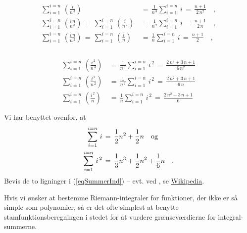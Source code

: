\begin{exercise}
\begin{equation}\label{eqSummings2}
\begin{aligned}
\sum_{i=1}^{i=n}\, \left(\frac{i}{n^{\,3}}\right)\, &= \, \frac{1}{n^{\,3}}\sum_{i=1}^{i=n}\,i \, = \,   \frac{n+1}{2\,n^{2}}\quad , \\
\sum_{i=1}^{i=n}\, \left(\frac{i\,n}{n^{\,3}}\right) \,=\, \sum_{i=1}^{i=n}\, \left(\frac{i}{n^{\,2}}\right)\, &= \, \frac{1}{n^{\,2}}\sum_{i=1}^{i=n}\,i  \, = \,  \frac{n+1}{2\,n} \quad ,\\
\sum_{i=1}^{i=n}\, \left(\frac{i\,n}{n^{\,2}}\right) \,=\, \sum_{i=1}^{i=n}\, \left(\frac{i}{n}\right)\, &= \, \frac{1}{n}\sum_{i=1}^{i=n}\,i  \, = \,  \frac{n+1}{2} \quad ,\\ \\
\end{aligned}
\end{equation}


\begin{equation}\label{eqSummings3}
\begin{aligned}
\sum_{i=1}^{i=n}\, \left(\frac{i^{\,2}}{n^{\,3}}\right)\, &= \, \frac{1}{n^{\,3}}\sum_{i=1}^{i=n}\,i^{\,2}  \, = \, \frac{2\,n^{2} + 3\,n + 1}{6\,n^{2}}\\
\sum_{i=1}^{i=n}\, \left(\frac{i^{\,2}}{n^{\,2}}\right)\, &= \, \frac{1}{n^{\,2}}\sum_{i=1}^{i=n}\,i^{\,2}  \, = \,  \frac{2\,n^{2} + 3\,n + 1}{6\,n}\\
\sum_{i=1}^{i=n}\, \left(\frac{i^{\,2}}{n}\right)\, &= \, \frac{1}{n}\sum_{i=1}^{i=n}\,i^{\,2}  \, = \,  \frac{2\,n^{2} + 3\,n + 1}{6}\\ \\
\end{aligned}
\end{equation}
Vi har benyttet ovenfor, at
\begin{equation} \label{eqSummerInd}
\begin{aligned}
\sum_{i=1}^{i=n}\,i \, &= \, \frac{1}{2}n^{2} + \frac{1}{2}n \quad {\rm{og}}\\
\sum_{i=1}^{i=n}\,i^{\,2}\, &= \, \frac{1}{3}n^{3} + \frac{1}{2}n^{2} + \frac{1}{6}n \quad .
\end{aligned}
\end{equation}
Bevis de to  ligninger i (\ref{eqSummerInd}) -- evt. ved , se \href{http://en.wikipedia.org/wiki/Mathematical_induction}{Wikipedia}.
\end{exercise}

\begin{think}
Hvis vi ønsker at bestemme Riemann-integraler for funktioner, der ikke er så simple som polynomier, så er det ofte simplest at benytte stamfunktionsberegningen i stedet for
at vurdere grænseværdierne for integral-summerne.
\end{think}

